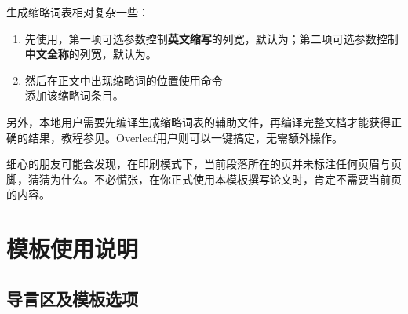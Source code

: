 \documentclass[print, doctor, vlined]{DissertUESTC}
\begin{document}
	
	
	\printnomenclature
	
	生成缩略词表相对复杂一些：
	\begin{enumerate}
		\item 先使用，第一项可选参数控制\textbf{英文缩写}的列宽，默认为\shad{5em}；第二项可选参数控制\textbf{中文全称}的列宽，默认为\shad{7.5em}。
		
		\item 然后在正文中出现缩略词的位置使用命令\\添加该缩略词条目。
	\end{enumerate}
	
	另外，本地用户需要先编译生成缩略词表的辅助文件，再编译完整文档才能获得正确的结果，教程参见\href{https://zhuanlan.zhihu.com/p/46442713}{}。Overleaf用户则可以一键搞定，无需额外操作。
	
	细心的朋友可能会发现，在印刷模式下，当前段落所在的页并未标注任何页眉与页脚，猜猜为什么。不必慌张，在你正式使用本模板撰写论文时，肯定不需要当前页的内容。
	
	\chapter{模板使用说明}
	
	\section{导言区及模板选项}
\end{document}
